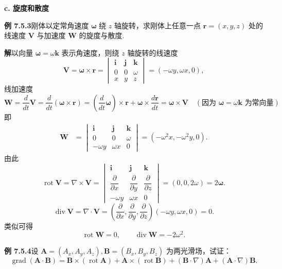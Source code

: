 \documentclass[UTF8,12pt,a4paper,fontset=fandol]{ctexart}
\begin{document}
\noindent\textbf{c. 旋度和散度}

\noindent\textbf{例 7.5.3}\quad 刚体以定常角速度 $\boldsymbol\omega$ 绕 $z$ 轴旋转，求刚体上任意一点 $\mathbf r=(x,y,z)$ 处的线速度 $\mathbf V$ 与加速度 $\mathbf W$ 的旋度与散度.

\noindent\textbf{解}\quad 以向量 $\boldsymbol\omega=\omega\mathbf k$ 表示角速度，则绕 $z$ 轴旋转的线速度
\[
\mathbf V=\boldsymbol\omega\times\mathbf r
=
\begin{vmatrix}
\mathbf i & \mathbf j & \mathbf k\\
0 & 0 & \omega\\
x & y & z
\end{vmatrix}
=(-\omega y,\omega x,0),
\]
线加速度
\[
\mathbf W=\frac d{dt}\mathbf V
=\frac d{dt}(\boldsymbol\omega\times\mathbf r)
=\left(\frac d{dt}\boldsymbol\omega\right)\times\mathbf r+\boldsymbol\omega\times\frac{d\mathbf r}{dt}
=\boldsymbol\omega\times\mathbf V
\quad(\text{因为 }\boldsymbol\omega=\omega\mathbf k\text{ 为常向量})
\]
即
\[
\begin{aligned}
\mathbf W
&=
\begin{vmatrix}
\mathbf i & \mathbf j & \mathbf k\\
0 & 0 & \omega\\
-\omega y & \omega x & 0
\end{vmatrix}
=(-\omega^2x,-\omega^2y,0).
\end{aligned}
\]
由此
\[
\operatorname{rot}\mathbf V=\nabla\times\mathbf V
=
\begin{vmatrix}
\mathbf i & \mathbf j & \mathbf k\\
\dfrac{\partial}{\partial x} & \dfrac{\partial}{\partial y} & \dfrac{\partial}{\partial z}\\
-\omega y & \omega x & 0
\end{vmatrix}
=(0,0,2\omega)=2\boldsymbol\omega.
\]
\[
\operatorname{div}\mathbf V=\nabla\cdot\mathbf V
=\left(\frac{\partial}{\partial x},\frac{\partial}{\partial y},\frac{\partial}{\partial z}\right)(-\omega y,\omega x,0)=0.
\]
类似可得
\[
\operatorname{rot}\mathbf W=0,\qquad \operatorname{div}\mathbf W=-2\omega^2.
\]

\noindent\textbf{例 7.5.4}\quad 设 $\mathbf A=(A_x,A_y,A_z),\mathbf B=(B_x,B_y,B_z)$ 为两光滑场，试证：
\[
\operatorname{grad}(\mathbf A\cdot\mathbf B)
=\mathbf B\times(\operatorname{rot}\mathbf A)+\mathbf A\times(\operatorname{rot}\mathbf B)+(\mathbf B\cdot\nabla)\mathbf A+(\mathbf A\cdot\nabla)\mathbf B. \tag{1}
\]
\end{document}
